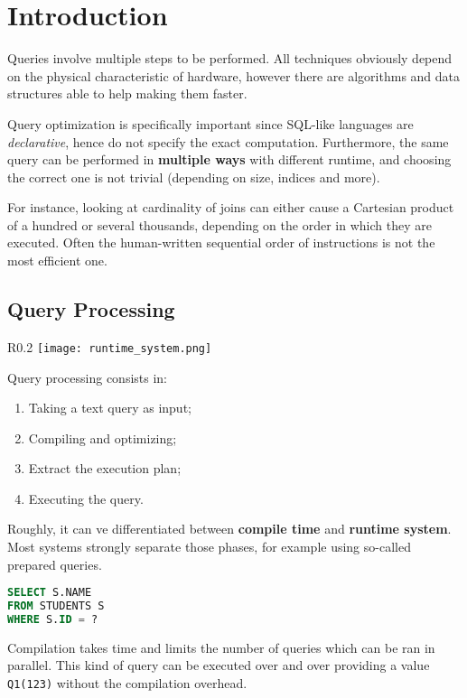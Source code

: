 
\section{Introduction}
Queries involve multiple steps to be performed. All techniques obviously depend on the physical characteristic of hardware, however there are algorithms and data structures able to help making them faster.

Query optimization is specifically important since SQL-like languages are \textit{declarative}, hence do not specify the exact computation. Furthermore, the same query can be performed in \textbf{multiple ways} with different runtime, and choosing the correct one is not trivial (depending on size, indices and more).

For instance, looking at cardinality of joins can either cause a Cartesian product of a hundred or several thousands, depending on the order in which they are executed. Often the human-written sequential order of instructions is not the most efficient one.

\subsection{Query Processing}
\begin{wrapfigure}{R}{0.2\textwidth}
	\vspace{-35pt}
	\texttt{[image: runtime\_system.png]}
	\vspace{-100pt}
\end{wrapfigure}
Query processing consists in: 
\begin{enumerate}
	\item Taking a text query as input;
	\item Compiling and optimizing;
	\item Extract the execution plan;
	\item Executing the query.
\end{enumerate}
Roughly, it can ve differentiated between \textbf{compile time} and \textbf{runtime system}. Most systems strongly separate those phases, for example using so-called prepared queries.
\begin{lstlisting}[language=SQL]
SELECT S.NAME
FROM STUDENTS S
WHERE S.ID = ?
\end{lstlisting}

Compilation takes time and limits the number of queries which can be ran in parallel. This kind of query can be executed over and over providing a value \texttt{Q1(123)} without the compilation overhead.

